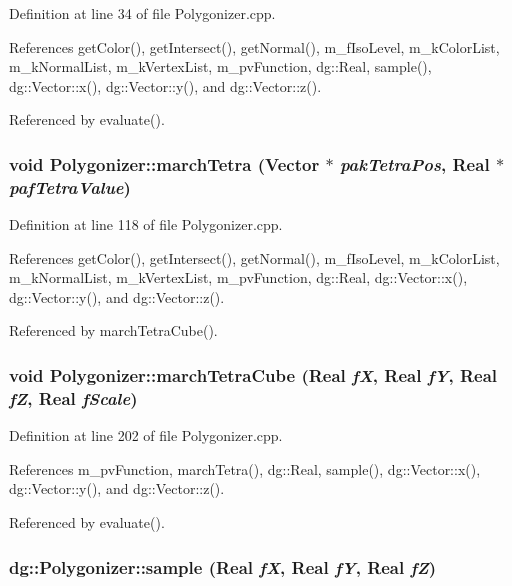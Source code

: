 Definition at line 34 of file Polygonizer.cpp.

References get\-Color(), get\-Intersect(), get\-Normal(), m\_\-f\-Iso\-Level, m\_\-k\-Color\-List, m\_\-k\-Normal\-List, m\_\-k\-Vertex\-List, m\_\-pv\-Function, dg::Real, sample(), dg::Vector::x(), dg::Vector::y(), and dg::Vector::z().

Referenced by evaluate().
\subsubsection{\setlength{\rightskip}{0pt plus 5cm}void Polygonizer::march\-Tetra ({\bf Vector} $\ast$ {\em pak\-Tetra\-Pos}, {\bf Real} $\ast$ {\em paf\-Tetra\-Value})}\label{classdg_1_1Polygonizer_a22}




Definition at line 118 of file Polygonizer.cpp.

References get\-Color(), get\-Intersect(), get\-Normal(), m\_\-f\-Iso\-Level, m\_\-k\-Color\-List, m\_\-k\-Normal\-List, m\_\-k\-Vertex\-List, m\_\-pv\-Function, dg::Real, dg::Vector::x(), dg::Vector::y(), and dg::Vector::z().

Referenced by march\-Tetra\-Cube().
\subsubsection{\setlength{\rightskip}{0pt plus 5cm}void Polygonizer::march\-Tetra\-Cube ({\bf Real} {\em f\-X}, {\bf Real} {\em f\-Y}, {\bf Real} {\em f\-Z}, {\bf Real} {\em f\-Scale})}\label{classdg_1_1Polygonizer_a23}




Definition at line 202 of file Polygonizer.cpp.

References m\_\-pv\-Function, march\-Tetra(), dg::Real, sample(), dg::Vector::x(), dg::Vector::y(), and dg::Vector::z().

Referenced by evaluate().
\subsubsection{ dg::Polygonizer::sample ({\bf Real} {\em f\-X}, {\bf Real} {\em f\-Y}, {\bf Real} {\em f\-Z})\hspace{0.3cm}{\tt  [inline]}}\label{classdg_1_1Polygonizer_a1}





